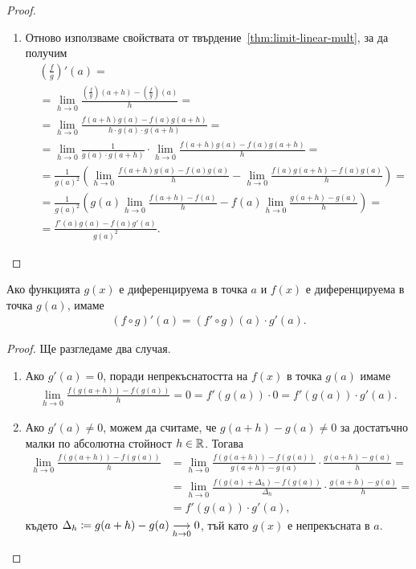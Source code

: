 \documentclass[numbers=endperiod, bibliography=totocnumbered]{scrartcl}
\begin{document}
\begin{proof}
\begin{enumerate}
    \item Отново използваме свойствата от твърдение~\ref{thm:limit-linear-mult}, за да получим
    \begin{align*}
      &\left( \frac f g \right)'(a)
      = \\ &=
      \lim_{h \to 0} \frac {\left(\frac f g \right)(a+h) - \left(\frac f g \right)(a)} h
      = \\ &=
      \lim_{h \to 0} \frac {f(a+h) g(a) - f(a) g(a+h)} {h \cdot g(a) \cdot g(a+h)}
      = \\ &=
      \lim_{h \to 0} \frac 1 {g(a) \cdot g(a+h)} \cdot \lim_{h \to 0} \frac {f(a+h) g(a) - f(a) g(a+h)} h
      = \\ &=
      \frac 1 {{g(a)}^2} \left( \lim_{h \to 0} \frac {f(a+h) g(a) - f(a) g(a)} h - \lim_{h \to 0} \frac {f(a) g(a+h) - f(a) g(a)} h \right)
      = \\ &=
      \frac 1 {{g(a)}^2} \left( g(a) \lim_{h \to 0} \frac {f(a+h) - f(a)} h - f(a) \lim_{h \to 0} \frac {g(a+h) - g(a)} h \right)
      = \\ &=
      \frac {f'(a) g(a) - f(a) g'(a)} {{g(a)}^2}.
    \end{align*}
  \end{enumerate}
\end{proof}

\begin{theorem}\label{thm:chain-rule}
  Ако функцията \( g(x) \) е диференцируема в точка \( a \) и \( f(x) \) е диференцируема в точка \( g(a) \), имаме
  \begin{align*}
    (f \circ g)'(a) = (f' \circ g)(a) \cdot g'(a).
  \end{align*}
\end{theorem}
\begin{proof}
  Ще разгледаме два случая.

  \begin{enumerate}
    \item Ако \( g'(a) = 0 \), поради непрекъснатостта на \( f(x) \) в точка \( g(a) \) имаме
    \begin{align*}
      \lim_{h \to 0} \frac {f(g(a+h)) - f(g(a))} h
      =
      0
      =
      f'(g(a)) \cdot 0
      =
      f'(g(a)) \cdot g'(a).
    \end{align*}

    \item Ако \( g'(a) \neq 0 \), можем да считаме, че \( g(a+h) - g(a) \neq 0 \) за достатъчно малки по абсолютна стойност \( h \in \R \). Тогава
    \begin{align*}
      \lim_{h \to 0} \frac {f(g(a+h)) - f(g(a))} h
      &=
      \lim_{h \to 0} \frac {f(g(a+h)) - f(g(a))} {g(a+h) - g(a)} \cdot \frac {g(a+h) - g(a)} h
      = \\ &=
      \lim_{h \to 0} \frac {f(g(a) + \Delta_h) - f(g(a))} {\Delta_h} \cdot \frac {g(a+h) - g(a)} h
      = \\ &=
      f'(g(a)) \cdot g'(a),
    \end{align*}
    където \( \Delta_h \coloneqq g(a+h) - g(a) \Conv[h \to 0]{} 0 \), тъй като \( g(x) \) е непрекъсната в \( a \).
  \end{enumerate}
\end{proof}
\end{document}
